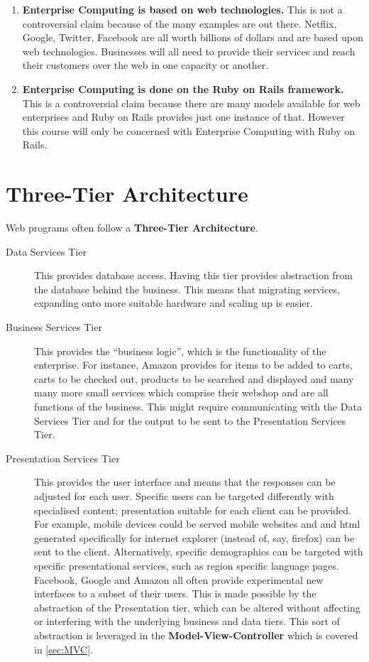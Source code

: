 \documentclass[11pt]{article}
\begin{document}
\begin{enumerate}
\item \textbf{Enterprise Computing is based on web technologies.} This is not a controversial claim because of the many examples are out there. Netflix, Google, Twitter, Facebook are all worth billions of dollars and are based upon web technologies. Businesses will all need to provide their services and reach their customers over the web in one capacity or another.
\item \textbf{Enterprise Computing is done on the Ruby on Rails framework.} This is a controversial claim because there are many models available for web enterprises and Ruby on Rails provides just one instance of that. However this course will only be concerned with Enterprise Computing with Ruby on Rails.
\end{enumerate}

\section{Three-Tier Architecture}
\label{sec:tier}

Web programs often follow a \textbf{Three-Tier Architecture}.
\begin{description}
\item[Data Services Tier]
This provides database access. Having this tier provides abstraction from the database behind the business. This means that migrating services, expanding onto more suitable hardware and scaling up is easier.
\item[Business Services Tier]
This provides the ``business logic'', which is the functionality of the enterprise. For instance, Amazon provides for items to be added to carts, carts to be checked out, products to be searched and displayed and many many more small services which comprise their webshop and are all functions of the business. This might require communicating with the Data Services Tier and for the output to be sent to the Presentation Services Tier.
\item[Presentation Services Tier]
This provides the user interface and means that the responses can be adjusted for each user. Specific users can be targeted differently with specialised content; presentation suitable for each client can be provided. For example, mobile devices could be served mobile websites and and html generated specifically for internet explorer (instead of, say, firefox) can be sent to the client. Alternatively, specific demographics can be targeted with specific presentational services, such as region specific language pages. Facebook, Google and Amazon all often provide experimental new interfaces to a subset of their users. This is made possible by the abstraction of the Presentation tier, which can be altered without affecting or interfering with the underlying business and data tiers. This sort of abstraction is leveraged in the \textbf{Model-View-Controller} which is covered in \ref{sec:MVC}.   %
\end{description}
\end{document}
